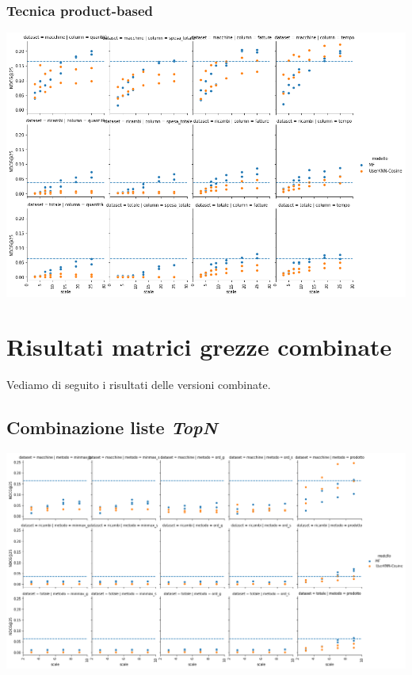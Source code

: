 \subsubsection{Tecnica product-based}

\includegraphics[width=16cm]{figures/prodotto.png}

\section{Risultati matrici grezze combinate}
Vediamo di seguito i risultati delle versioni combinate.

\subsection{Combinazione liste \textit{TopN}}
\includegraphics[width=16cm]{figures/comb_1.png}

